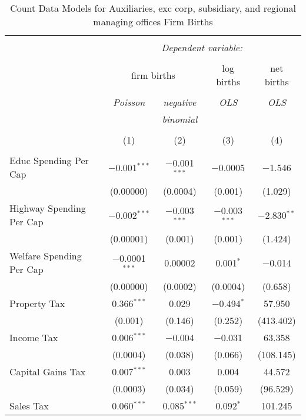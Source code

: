 
\begin{table}[!htbp] \centering 
  \caption{Count Data Models for Auxiliaries, exc corp, subsidiary, and regional managing offices Firm Births} 
  \label{} 
\begin{tabular}{@{\extracolsep{5pt}}lcccc} 
\\[-1.8ex]\hline 
\hline \\[-1.8ex] 
 & \multicolumn{4}{c}{\textit{Dependent variable:}} \\ 
\cline{2-5} 
\\[-1.8ex] & \multicolumn{2}{c}{firm births} & log births & net births \\ 
\\[-1.8ex] & \textit{Poisson} & \textit{negative} & \textit{OLS} & \textit{OLS} \\ 
 & \textit{} & \textit{binomial} & \textit{} & \textit{} \\ 
\\[-1.8ex] & (1) & (2) & (3) & (4)\\ 
\hline \\[-1.8ex] 
 Educ Spending Per Cap & $-$0.001$^{***}$ & $-$0.001$^{***}$ & $-$0.0005 & $-$1.546 \\ 
  & (0.00000) & (0.0004) & (0.001) & (1.029) \\ 
  Highway Spending Per Cap  & $-$0.002$^{***}$ & $-$0.003$^{***}$ & $-$0.003$^{***}$ & $-$2.830$^{**}$ \\ 
  & (0.00001) & (0.001) & (0.001) & (1.424) \\ 
  Welfare Spending Per Cap  & $-$0.0001$^{***}$ & 0.00002 & 0.001$^{*}$ & $-$0.014 \\ 
  & (0.00000) & (0.0002) & (0.0004) & (0.658) \\ 
  Property Tax & 0.366$^{***}$ & 0.029 & $-$0.494$^{*}$ & 57.950 \\ 
  & (0.001) & (0.146) & (0.252) & (413.402) \\ 
  Income Tax & 0.006$^{***}$ & $-$0.004 & $-$0.031 & 63.358 \\ 
  & (0.0004) & (0.038) & (0.066) & (108.145) \\ 
  Capital Gains Tax & 0.007$^{***}$ & 0.003 & 0.004 & 44.572 \\ 
  & (0.0003) & (0.034) & (0.059) & (96.529) \\ 
  Sales Tax & 0.060$^{***}$ & 0.085$^{***}$ & 0.092$^{*}$ & 101.245 \\ 

\end{tabular}
\end{table}
